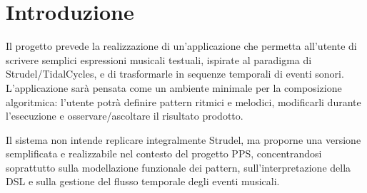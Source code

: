 \section{Introduzione}
Il progetto prevede la realizzazione di un’applicazione che permetta all’utente di scrivere semplici espressioni musicali testuali, ispirate al paradigma di Strudel/TidalCycles, e di trasformarle in sequenze temporali di eventi sonori. L’applicazione sarà pensata come un ambiente minimale per la composizione algoritmica: l’utente potrà definire pattern ritmici e melodici, modificarli durante l’esecuzione e osservare/ascoltare il risultato prodotto.

Il sistema non intende replicare integralmente Strudel, ma proporne una versione semplificata e realizzabile nel contesto del progetto PPS, concentrandosi soprattutto sulla modellazione funzionale dei pattern, sull’interpretazione della DSL e sulla gestione del flusso temporale degli eventi musicali.

